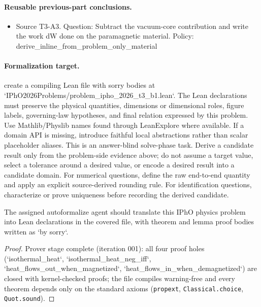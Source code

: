 \paragraph{Reusable previous-part conclusions.}
\begin{itemize}
\item Source T3-A3. Question: Subtract the vacuum-core contribution and write the work dW done on the paramagnetic material. Policy: derive\_inline\_from\_problem\_only\_material
\end{itemize}

\paragraph{Formalization target.}
create a compiling Lean file with sorry bodies at `IPhO2026Problems/problem\_ipho\_2026\_t3\_b1.lean`.
The Lean declarations must preserve the physical quantities, dimensions or dimensional roles, figure labels, governing-law hypotheses, and final relation expressed by this problem.
Use Mathlib/Physlib names found through LeanExplore where available. If a domain API is missing, introduce faithful local abstractions rather than scalar placeholder aliases.
This is an answer-blind solve-phase task. Derive a candidate result only from the problem-side evidence above; do not assume a target value, select a tolerance around a desired value, or encode a desired result into a candidate domain.
For numerical questions, define the raw end-to-end quantity and apply an explicit source-derived rounding rule. For identification questions, characterize or prove uniqueness before recording the derived candidate.

\begin{theorem}
\label{thm:physics:ipho_2026_t3_b1:target}
\leanok
The assigned autoformalize agent should translate this IPhO physics problem into Lean declarations in the covered file, with theorem and lemma proof bodies written as `by sorry`.
\end{theorem}
\begin{proof}
\leanok
Prover stage complete (iteration 001): all four proof holes
(`isothermal_heat`, `isothermal_heat_neg\_iff`,
`heat\_flows\_out\_when\_magnetized`, `heat\_flows\_in\_when\_demagnetized`)
are closed with kernel-checked proofs; the file compiles warning-free and
every theorem depends only on the standard axioms
(\texttt{propext}, \texttt{Classical.choice}, \texttt{Quot.sound}).
\end{proof}
